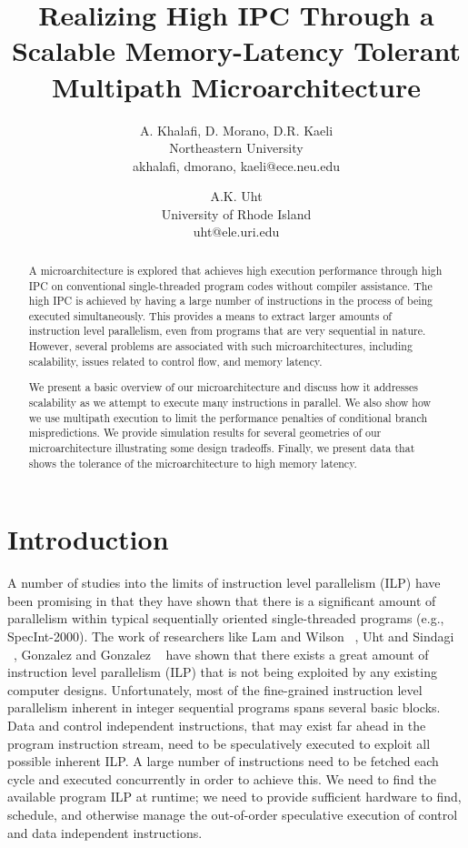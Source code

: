\documentclass[10pt,twocolumn,dvips]{article}
\begin{document}
\parskip 2mm
%
%
\title{Realizing High IPC Through a Scalable Memory-Latency Tolerant
Multipath Microarchitecture}
%
\author{
A. Khalafi, D. Morano, D.R. Kaeli\\
Northeastern University\\
{akhalafi, dmorano, kaeli}@ece.neu.edu\\
\and
A.K. Uht \\
University of Rhode Island\\ 
uht@ele.uri.edu
}
%
%
\date{}
%
%
\maketitle
%
\begin{abstract}
A microarchitecture is explored that achieves high execution
performance through high IPC on conventional single-threaded program
codes without compiler assistance.  The high IPC is achieved by having
a large number of instructions in the process of being executed
simultaneously.  This provides a means to extract larger amounts of
instruction level parallelism, even from programs that are very
sequential in nature.  However, several problems are associated with
such microarchitectures, including scalability, issues related to
control flow, and memory latency.

We present a basic overview of our microarchitecture and discuss how it
addresses scalability as we attempt to execute many instructions in
parallel.  We also show how we use multipath execution to limit the
performance penalties of conditional branch mispredictions.  We provide
simulation results for several geometries of our microarchitecture
illustrating some design tradeoffs.  Finally, we present data that
shows the tolerance of the microarchitecture to high memory latency.
\end{abstract}
%
%
\section{Introduction}
%
A number of studies into the limits of instruction level 
parallelism (ILP) have
been promising in that they have shown that there is 
a significant amount of parallelism within
typical sequentially oriented single-threaded programs
(e.g., SpecInt-2000).  
The work of researchers like
Lam and Wilson ~\cite{Lam92},
Uht and Sindagi ~\cite{Uht95},
Gonzalez and Gonzalez ~\cite{Gon97}
have shown that there exists a great amount of instruction level
parallelism (ILP) that is not being exploited by any existing
computer designs.
Unfortunately, most of the fine-grained instruction level
parallelism inherent in integer sequential programs
spans several basic blocks.  
Data and control independent instructions, that may exist
far ahead in the program instruction stream, need to be
speculatively executed to exploit all possible inherent
ILP.
A large number of instructions need to be fetched
each cycle and executed concurrently in order to achieve this.
We need to find the available program ILP at runtime; we need to 
provide sufficient hardware to find, schedule,
and otherwise manage the out-of-order speculative execution of
control and data independent instructions.
\end{document}
